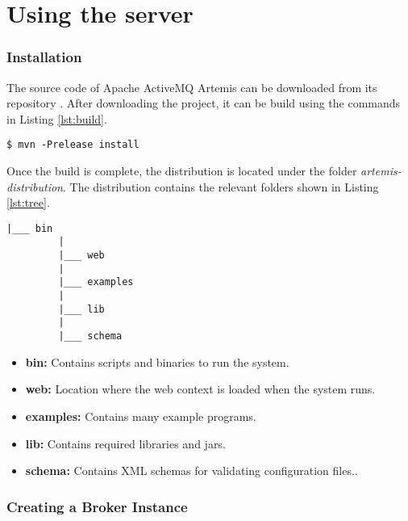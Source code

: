 \section{Using the server}

\subsubsection{Installation}

The source code of Apache ActiveMQ Artemis can be downloaded from its repository \parencite{artemis_github}. After downloading the project, it can be build using the commands in Listing \ref{lst:build}.

\bigskip
\begin{lstlisting}[style=BashInputStyle,caption=Building Apache ActiveMQ Artemis, label={lst:build}]
  $ mvn -Prelease install
\end{lstlisting}

Once the build is complete, the distribution is located under the folder \textit{artemis-distribution}.
The distribution contains the relevant folders shown in Listing \ref{lst:tree}.

\begin{lstlisting}[style=Tree,caption=Apache ActiveMQ Artemis Folders, label={lst:tree}]
         |___ bin
         |
         |___ web
         |
         |___ examples
         |
         |___ lib
         |
         |___ schema
\end{lstlisting}

\begin{itemize}
    \item \textbf{bin:}
        Contains scripts and binaries to run the system.

    \item \textbf{web:}
        Location where the web context is loaded when the system runs.

    \item \textbf{examples:}
        Contains many example programs.

    \item \textbf{lib:}
        Contains required libraries and jars.

    \item \textbf{schema:}
        Contains XML schemas for validating configuration files..
         
\end{itemize}


\subsubsection{Creating a Broker Instance}


